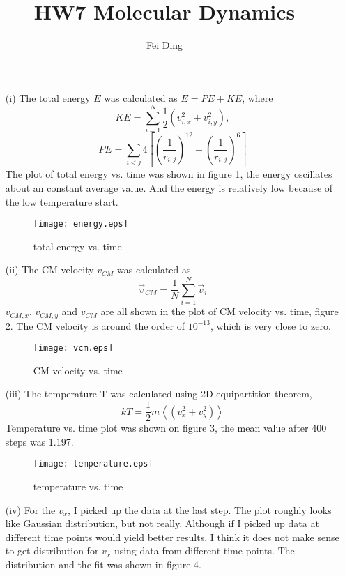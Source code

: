 \documentclass{article}
\title{HW7 Molecular Dynamics}
\author{Fei Ding}
\begin{document}
\maketitle
\vskip 1cm

\begin{enumerate}
\item[(i)]
The total energy $E$ was calculated as $E=PE+KE$, where
\[KE=\sum_{i=1}^N \frac{1}{2} (v_{i,x}^2 + v_{i,y}^2),\]
\[PE=\sum_{i<j}4 \left[ \left(\frac{1}{r_{i,j}}\right)^{12}-\left(\frac{1}{r_{i,j}}\right)^{6} \right]\]
The plot of total energy vs. time was shown in figure 1, the energy oscillates about an constant average value.  And the energy is relatively low because of the low temperature start.
  \begin{figure}[ht]
   \begin{center}
   {\texttt{[image: energy.eps]}}
   \caption{total energy vs. time}
   \end{center}
  \end{figure}

\vskip 1cm
\item[(ii)]
The CM velocity $v_{CM}$ was calculated as
\[\vec{v}_{CM}=\frac{1}{N}\sum_{i=1}^N  \vec{v}_{i}\]
$v_{CM,x}$, $v_{CM,y}$ and $v_{CM}$ are all shown in the plot of CM velocity vs. time, figure 2.  The CM velocity is around the order of $10^{-13}$, which is very close to zero.

 \begin{figure}[ht]
   \begin{center}
   {\texttt{[image: vcm.eps]}}
   \caption{CM velocity vs. time}
   \end{center}
  \end{figure}

\vskip 1cm
\item[(iii)]
The temperature T was calculated using 2D equipartition theorem,
\[k T = \frac{1}{2}m \left\langle ({v}_x^2+{v}_y^2) \right\rangle\]
Temperature vs. time plot was shown on figure 3, the mean value after 400 steps was 1.197.
\begin{figure}[ht]
   \begin{center}
   {\texttt{[image: temperature.eps]}}
   \caption{temperature vs. time}
   \end{center}
  \end{figure}


\vskip 1cm
\item[(iv)]
For the $v_x$, I picked up the data at the last step.  The plot roughly looks like Gaussian distribution, but not really.  Although if I picked up data at different time points would yield better results, I think it does not make sense to get distribution for $v_x$ using data from different time points.  The distribution and the fit was shown in figure 4.


\end{enumerate}
\end{document}
